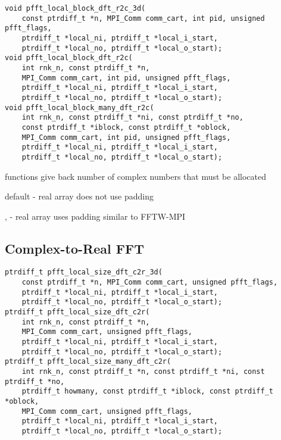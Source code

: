 \begin{lstlisting}
void pfft_local_block_dft_r2c_3d(
    const ptrdiff_t *n, MPI_Comm comm_cart, int pid, unsigned pfft_flags,
    ptrdiff_t *local_ni, ptrdiff_t *local_i_start,
    ptrdiff_t *local_no, ptrdiff_t *local_o_start);
void pfft_local_block_dft_r2c(
    int rnk_n, const ptrdiff_t *n,
    MPI_Comm comm_cart, int pid, unsigned pfft_flags,
    ptrdiff_t *local_ni, ptrdiff_t *local_i_start,
    ptrdiff_t *local_no, ptrdiff_t *local_o_start);
void pfft_local_block_many_dft_r2c(
    int rnk_n, const ptrdiff_t *ni, const ptrdiff_t *no,
    const ptrdiff_t *iblock, const ptrdiff_t *oblock,
    MPI_Comm comm_cart, int pid, unsigned pfft_flags,
    ptrdiff_t *local_ni, ptrdiff_t *local_i_start,
    ptrdiff_t *local_no, ptrdiff_t *local_o_start);
\end{lstlisting}

\begin{compactitem}
  \item {} functions give back number of complex numbers that must be allocated
  \item default - real array does not use padding
  \item {},  - real array uses padding similar to FFTW-MPI
\end{compactitem}

\subsection{Complex-to-Real FFT}
\begin{lstlisting}
ptrdiff_t pfft_local_size_dft_c2r_3d(
    const ptrdiff_t *n, MPI_Comm comm_cart, unsigned pfft_flags,
    ptrdiff_t *local_ni, ptrdiff_t *local_i_start,
    ptrdiff_t *local_no, ptrdiff_t *local_o_start);
ptrdiff_t pfft_local_size_dft_c2r(
    int rnk_n, const ptrdiff_t *n,
    MPI_Comm comm_cart, unsigned pfft_flags,
    ptrdiff_t *local_ni, ptrdiff_t *local_i_start,
    ptrdiff_t *local_no, ptrdiff_t *local_o_start);
ptrdiff_t pfft_local_size_many_dft_c2r(
    int rnk_n, const ptrdiff_t *n, const ptrdiff_t *ni, const ptrdiff_t *no,
    ptrdiff_t howmany, const ptrdiff_t *iblock, const ptrdiff_t *oblock,
    MPI_Comm comm_cart, unsigned pfft_flags,
    ptrdiff_t *local_ni, ptrdiff_t *local_i_start,
    ptrdiff_t *local_no, ptrdiff_t *local_o_start);
\end{lstlisting}


